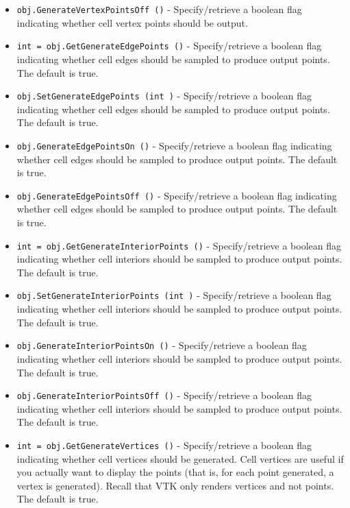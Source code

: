 \begin{itemize}
\item  \verb|obj.GenerateVertexPointsOff ()| -  Specify/retrieve a boolean flag indicating whether cell vertex points should
 be output.

\item  \verb|int = obj.GetGenerateEdgePoints ()| -  Specify/retrieve a boolean flag indicating whether cell edges should
 be sampled to produce output points. The default is true.

\item  \verb|obj.SetGenerateEdgePoints (int )| -  Specify/retrieve a boolean flag indicating whether cell edges should
 be sampled to produce output points. The default is true.

\item  \verb|obj.GenerateEdgePointsOn ()| -  Specify/retrieve a boolean flag indicating whether cell edges should
 be sampled to produce output points. The default is true.

\item  \verb|obj.GenerateEdgePointsOff ()| -  Specify/retrieve a boolean flag indicating whether cell edges should
 be sampled to produce output points. The default is true.

\item  \verb|int = obj.GetGenerateInteriorPoints ()| -  Specify/retrieve a boolean flag indicating whether cell interiors should
 be sampled to produce output points. The default is true.

\item  \verb|obj.SetGenerateInteriorPoints (int )| -  Specify/retrieve a boolean flag indicating whether cell interiors should
 be sampled to produce output points. The default is true.

\item  \verb|obj.GenerateInteriorPointsOn ()| -  Specify/retrieve a boolean flag indicating whether cell interiors should
 be sampled to produce output points. The default is true.

\item  \verb|obj.GenerateInteriorPointsOff ()| -  Specify/retrieve a boolean flag indicating whether cell interiors should
 be sampled to produce output points. The default is true.

\item  \verb|int = obj.GetGenerateVertices ()| -  Specify/retrieve a boolean flag indicating whether cell vertices should
 be generated. Cell vertices are useful if you actually want to display
 the points (that is, for each point generated, a vertex is generated).
 Recall that VTK only renders vertices and not points. 
 The default is true.


\end{itemize}
